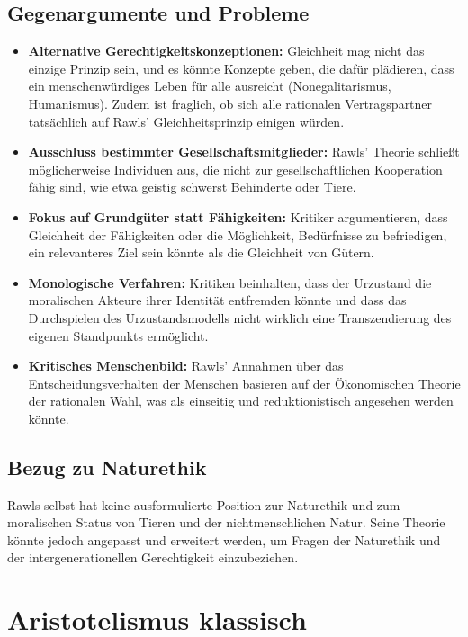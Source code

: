 \documentclass{article}
\begin{document}
\subsection{Gegenargumente und Probleme}

\begin{itemize}
	\item \textbf{Alternative Gerechtigkeitskonzeptionen:} Gleichheit mag nicht das einzige Prinzip sein, und es könnte Konzepte geben, die dafür plädieren, dass ein menschenwürdiges Leben für alle ausreicht (Nonegalitarismus, Humanismus). Zudem ist fraglich, ob sich alle rationalen Vertragspartner tatsächlich auf Rawls' Gleichheitsprinzip einigen würden.
	\item \textbf{Ausschluss bestimmter Gesellschaftsmitglieder:} Rawls' Theorie schließt möglicherweise Individuen aus, die nicht zur gesellschaftlichen Kooperation fähig sind, wie etwa geistig schwerst Behinderte oder Tiere.
	\item \textbf{Fokus auf Grundgüter statt Fähigkeiten:} Kritiker argumentieren, dass Gleichheit der Fähigkeiten oder die Möglichkeit, Bedürfnisse zu befriedigen, ein relevanteres Ziel sein könnte als die Gleichheit von Gütern.
	\item \textbf{Monologische Verfahren:} Kritiken beinhalten, dass der Urzustand die moralischen Akteure ihrer Identität entfremden könnte und dass das Durchspielen des Urzustandsmodells nicht wirklich eine Transzendierung des eigenen Standpunkts ermöglicht.
	\item \textbf{Kritisches Menschenbild:} Rawls' Annahmen über das Entscheidungsverhalten der Menschen basieren auf der Ökonomischen Theorie der rationalen Wahl, was als einseitig und reduktionistisch angesehen werden könnte.
\end{itemize}

\subsection{Bezug zu Naturethik}

Rawls selbst hat keine ausformulierte Position zur Naturethik und zum moralischen Status von Tieren und der nichtmenschlichen Natur. Seine Theorie könnte jedoch angepasst und erweitert werden, um Fragen der Naturethik und der intergenerationellen Gerechtigkeit einzubeziehen.

\newpage
\section{Aristotelismus klassisch}
\end{document}
